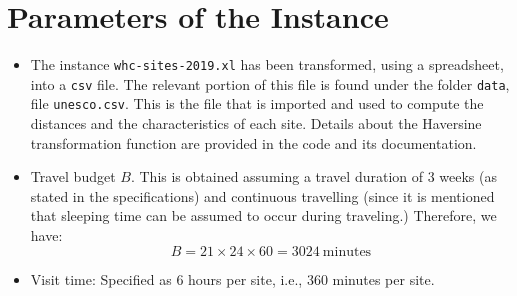 \documentclass[12pt]{article}
\begin{document}
\section{Parameters of the Instance}

\begin{itemize}
\item The instance \texttt{whc-sites-2019.xl} has been transformed, using a
spreadsheet, into a \texttt{csv} file. The relevant portion of this file is found under
the folder \texttt{data}, file \texttt{unesco.csv}. This is the file that is
imported and used to compute the distances and the characteristics of each
site. Details about the Haversine transformation function are provided in the
code and its documentation.
\item Travel budget $B$. This is obtained assuming a travel duration of 3 weeks
(as stated in the specifications) and continuous travelling (since it is
mentioned that sleeping time can be assumed to occur during traveling.)
Therefore, we have:
\[
B = 21\times 24\times 60 = 3024~\text{minutes}
\]
\item Visit time: Specified as 6 hours per site, i.e., 360 minutes per site.

\end{itemize}
\end{document}
